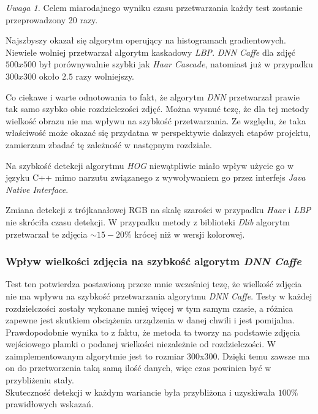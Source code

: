\par
\textit{Uwaga 1.}\label{uwaga:ilosc_powtorzen} Celem miarodajnego wyniku czasu przetwarzania każdy test zostanie przeprowadzony 20 razy.

\vspace{10mm}




Najszbyszy okazał się algorytm operujący na histogramach gradientowych. Niewiele wolniej przetwarzał algorytm kaskadowy \textit{LBP}. \textit{DNN Caffe} dla zdjęć $500x500$  był porównywalnie szybki jak \textit{Haar Cascade}, natomiast już w przypadku $300x300$ około $2.5$ razy wolniejszy.
\par
Co ciekawe i warte odnotowania to fakt, że algorytm \textit{DNN} przetwarzał prawie tak samo szybko obie rozdzielczości zdjęć. Można wysnuć tezę, że dla tej metody wielkość obrazu nie ma wpływu na szybkość przetwarzania. Ze względu, że taka właściwość może okazać się przydatna w perspektywie dalszych etapów projektu, zamierzam zbadać tę zależność w następnym rozdziale.
\par
Na szybkość detekcji algorytmu \textit{HOG} niewątpliwie miało wpływ użycie go w języku C++ mimo narzutu związanego z wywoływaniem go przez interfejs \textit{Java Native Interface}.

\vspace{5mm}

Zmiana detekcji z trójkanałowej RGB na skalę szarości w przypadku \textit{Haar} i \textit{LBP} nie skróciła czasu detekcji. W przypadku metody z biblioteki \textit{Dlib} algorytm przetwarzał te zdjęcia $\sim15-20 \%$ krócej niż w wersji kolorowej.


\subsubsection{Wpływ wielkości zdjęcia na szybkość algorytm \textit{DNN Caffe}}



Test ten potwierdza postawioną przeze mnie wcześniej tezę, że wielkość zdjęcia nie ma wpływu na szybkość przetwarzania algorytmu \textit{DNN Caffe}. Testy w każdej rozdzielczości zostały wykonane mniej więcej w tym samym czasie, a różnica zapewne jest skutkiem obciążenia urządzenia w danej chwili i jest pomijalna.\\
Prawdopodobnie wynika to z faktu, że metoda ta tworzy na podstawie zdjęcia wejściowego plamki o podanej wielkości niezależnie od rozdzielczości. W zaimplementowanym algorytmie jest to rozmiar 300x300. Dzięki temu zawsze ma on do przetworzenia taką samą ilość danych, więc czas powinien być w przybliżeniu stały. \\
Skuteczność detekcji w każdym wariancie była przybliżona i uzyskiwała $100 \%$ prawidłowych wskazań.

